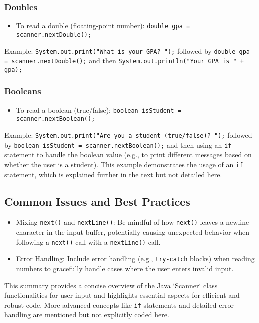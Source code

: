 \documentclass{article}
\begin{document}
\subsubsection{Doubles}

\begin{itemize}
    \item To read a double (floating-point number): \texttt{double gpa = scanner.nextDouble(); }
\end{itemize}

Example:  \texttt{System.out.print("What is your GPA? ");} followed by \texttt{double gpa = scanner.nextDouble();} and then \texttt{System.out.println("Your GPA is " + gpa);}


\subsubsection{Booleans}

\begin{itemize}
    \item To read a boolean (true/false): \texttt{boolean isStudent = scanner.nextBoolean(); }
\end{itemize}

Example: \texttt{System.out.print("Are you a student (true/false)? ");} followed by  \texttt{boolean isStudent = scanner.nextBoolean();} and then using an \texttt{if} statement to handle the boolean value (e.g., to print different messages based on whether the user is a student).  This example demonstrates the usage of an \texttt{if} statement, which is explained further in the text but not detailed here.


\subsection{Common Issues and Best Practices}

\begin{itemize}
    \item  Mixing \texttt{next()} and \texttt{nextLine()}:  Be mindful of how \texttt{next()} leaves a newline character in the input buffer, potentially causing unexpected behavior when following a \texttt{next()} call with a \texttt{nextLine()} call.
    \item Error Handling: Include error handling (e.g., \texttt{try-catch} blocks) when reading numbers to gracefully handle cases where the user enters invalid input.
\end{itemize}

This summary provides a concise overview of the Java `Scanner` class functionalities for user input and highlights essential aspects for efficient and robust code.  More advanced concepts like \texttt{if} statements and detailed error handling are mentioned but not explicitly coded here.
\end{document}
